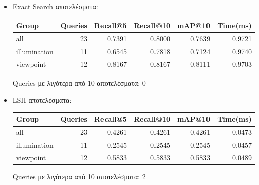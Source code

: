 \documentclass [conference]{IEEEtran}
\begin{document}
\begin{itemize}

    \item Exact Search αποτελέσματα:
    \begin{table}[H]
    \centering
    \small
    \setlength{\tabcolsep}{3pt}
    \begin{tabular}{l r r r r r}
    \hline
    \textbf{Group} & \textbf{Queries} & \textbf{Recall@5} & \textbf{Recall@10} & \textbf{mAP@10} & \textbf{Time(ms)} \\
    \hline
    all & 23 & 0.7391 & 0.8000 & 0.7639 & 0.9721 \\
    illumination & 11 & 0.6545 & 0.7818 & 0.7124 & 0.9740 \\
    viewpoint & 12 & 0.8167 & 0.8167 & 0.8111 & 0.9703 \\
    \hline
    \end{tabular}
    \par\smallskip
    \footnotesize Queries με λιγότερα από 10 αποτελέσματα: 0
    \end{table}
    

    \item LSH αποτελέσματα:
    \begin{table}[H]
    \centering
    \small
    \setlength{\tabcolsep}{3pt}
    \begin{tabular}{l r r r r r}
    \hline
    \textbf{Group} & \textbf{Queries} & \textbf{Recall@5} & \textbf{Recall@10} & \textbf{mAP@10} & \textbf{Time(ms)} \\
    \hline
    all & 23 & 0.4261 & 0.4261 & 0.4261 & 0.0473 \\
    illumination & 11 & 0.2545 & 0.2545 & 0.2545 & 0.0457 \\
    viewpoint & 12 & 0.5833 & 0.5833 & 0.5833 & 0.0489 \\
    \hline
    \end{tabular}
    \par\smallskip
    \footnotesize Queries με λιγότερα από 10 αποτελέσματα: 2
    \end{table}



\end{itemize}
\end{document}
